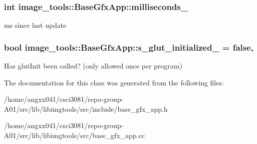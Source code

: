 \subsubsection[{\texorpdfstring{milliseconds\+\_\+}{milliseconds_}}]{\setlength{\rightskip}{0pt plus 5cm}int image\+\_\+tools\+::\+Base\+Gfx\+App\+::milliseconds\+\_\+\hspace{0.3cm}{\ttfamily [private]}}\hypertarget{classimage__tools_1_1BaseGfxApp_a2197d887035883be911d1ced510d99d9}{}\label{classimage__tools_1_1BaseGfxApp_a2197d887035883be911d1ced510d99d9}
ms since last update 
\subsubsection[{\texorpdfstring{s\+\_\+glut\+\_\+initialized\+\_\+}{s_glut_initialized_}}]{\setlength{\rightskip}{0pt plus 5cm}bool image\+\_\+tools\+::\+Base\+Gfx\+App\+::s\+\_\+glut\+\_\+initialized\+\_\+ = false\hspace{0.3cm}{\ttfamily [static]}, {\ttfamily [private]}}\hypertarget{classimage__tools_1_1BaseGfxApp_a4bfe294b3c2987edd8e8465e4047a064}{}\label{classimage__tools_1_1BaseGfxApp_a4bfe294b3c2987edd8e8465e4047a064}
Has glut\+Init been called? (only allowed once per program) 

The documentation for this class was generated from the following files\+:\begin{DoxyCompactItemize}
\item 
/home/angxx041/csci3081/repo-\/group-\/\+A01/src/lib/libimgtools/src/include/base\+\_\+gfx\+\_\+app.\+h\item 
/home/angxx041/csci3081/repo-\/group-\/\+A01/src/lib/libimgtools/src/base\+\_\+gfx\+\_\+app.\+cc\end{DoxyCompactItemize}
